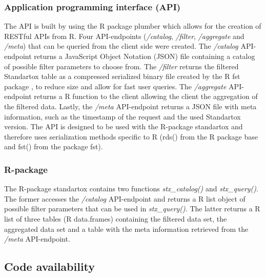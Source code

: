 \subsubsection*{Application programming interface (API)}
The API is built by using the R package plumber \citep{trestletechnologyllc_plumber_2018} which allows for the creation of RESTful APIs from R. Four API-endpoints (\textit{/catalog}, \textit{/filter}, \textit{/aggregate} and \textit{/meta}) that can be queried from the client side were created. The \textit{/catalog} API-endpoint returns a JavaScript Object Notation (JSON) file containing a catalog of possible filter parameters to choose from. The \textit{/filter} returns the filtered Standartox table as a compressed serialized binary file created by the R fst package \citep{klik_fst_2019}, to reduce size and allow for fast user queries. The \textit{/aggregate} API-endpoint returns a R function to the client allowing the client the aggregation of the filtered data. Lastly, the \textit{/meta} API-endpoint returns a JSON file with meta information, such as the timestamp of the request and the used Standartox version. The API is designed to be used with the R-package standartox and therefore uses serialization methods specific to R (rds() from the R package base and fst() from the package fst).




\subsubsection*{R-package}
The R-package standartox contains two functions \textit{stx\_catalog()} and \textit{stx\_query()}. The former accesses the \textit{/catalog} API-endpoint and returns a R list object of possible filter parameters that can be used in \textit{stx\_query()}. The latter returns a R list of three tables (R data.frames) containing the filtered data set, the aggregated data set and a table with the meta information retrieved from the \textit{/meta} API-endpoint.

\subsection*{Code availability}

